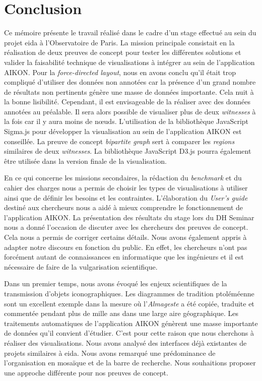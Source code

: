 \documentclass[a4paper,12pt,twoside]{book}
\newcommand{\clearemptydoublepage}{\newpage{\pagestyle{empty}\cleardoublepage}}
\newcommand\chapterNo[1]{
	\chapter*{#1}
	\markright{\MakeUppercase{#1}}
}
\newcommand{\almageste}{\textit{Almageste}\xspace}
\begin{document}
	\clearemptydoublepage
	
	\chapterNo{Conclusion}
	
	Ce mémoire présente le travail réalisé dans le cadre d'un stage effectué au sein du projet \gls{eida} à l'Observatoire de Paris. La mission principale consistait en la réalisation de deux preuves de concept pour tester les différentes solutions et valider la faisabilité technique de visualisations à intégrer au sein de l'application AIKON. Pour la \textit{force-directed layout}, nous en avons conclu qu'il était trop compliqué d'utiliser des données non annotées car la présence d'un grand nombre de résultats non pertinents génère une masse de données importante. Cela nuit à la bonne lisibilité. Cependant, il est envisageable de la réaliser avec des données annotées au préalable. Il sera alors possible de visualiser plus de deux \textit{witnesses} à la fois car il y aura moins de nœuds. L'utilisation de la bibliothèque JavaScript Sigma.js pour développer la visualisation au sein de l'application AIKON est conseillée. La preuve de concept \textit{bipartite graph} sert à comparer les \textit{regions} similaires de deux \textit{witnesses}. La bibliothèque JavaScript D3.js pourra également être utilisée dans la version finale de la visualisation.
	
	En ce qui concerne les missions secondaires, la rédaction du \textit{benchmark} et du cahier des charges nous a permis de choisir les types de visualisations à utiliser ainsi que de définir les besoins et les contraintes. L'élaboration du \textit{User's guide} destiné aux chercheurs nous a aidé à mieux comprendre le fonctionnement de l'application AIKON. La présentation des résultats du stage lors du DH Seminar nous a donné l'occasion de discuter avec les chercheurs des preuves de concept. Cela nous a permis de corriger certains détails. Nous avons également appris à adapter notre discours en fonction du public. En effet, les chercheurs n'ont pas forcément autant de connaissances en informatique que les ingénieurs et il est nécessaire de faire de la vulgarisation scientifique.
	
	Dans un premier temps, nous avons évoqué les enjeux scientifiques de la transmission d'objets iconographiques. Les diagrammes de tradition ptoléméenne sont un excellent exemple dans la mesure où l'\almageste a été copiée, traduite et commentée pendant plus de mille ans dans une large aire géographique. Les traitements automatiques de l'application AIKON génèrent une masse importante de données qu'il convient d'étudier. C'est pour cette raison que nous cherchons à réaliser des visualisations. Nous avons analysé des interfaces déjà existantes de projets similaires à \gls{eida}. Nous avons remarqué une prédominance de l'organisation en mosaïque et de la barre de recherche. Nous souhaitions proposer une approche différente pour nos preuves de concept. 
	
\end{document}
